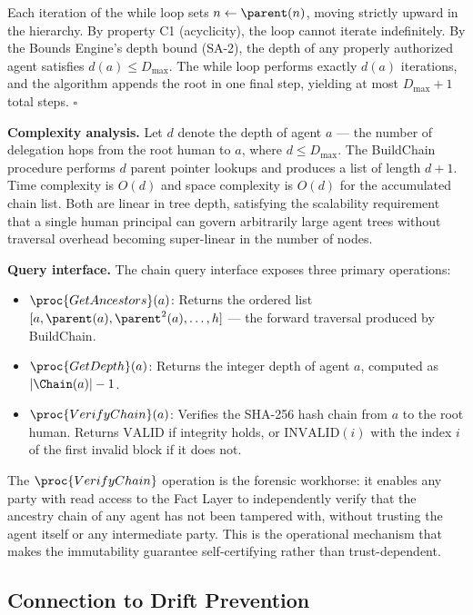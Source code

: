 \begin{Proof}
Each iteration of the while loop sets $n \gets \parent(n)$, moving strictly upward in the hierarchy. By property C1 (acyclicity), the loop cannot iterate indefinitely. By the Bounds Engine's depth bound (SA-2), the depth of any properly authorized agent satisfies $d(a) \leq D_{\max}$. The while loop performs exactly $d(a)$ iterations, and the algorithm appends the root in one final step, yielding at most $D_{\max} + 1$ total steps. $\square$
\end{Proof}

\bigskip
\noindent\textbf{Complexity analysis.} Let $d$ denote the depth of agent $a$ — the number of delegation hops from the root human to $a$, where $d \leq D_{\max}$. The BuildChain procedure performs $d$ parent pointer lookups and produces a list of length $d + 1$. Time complexity is $O(d)$ and space complexity is $O(d)$ for the accumulated chain list. Both are linear in tree depth, satisfying the scalability requirement that a single human principal can govern arbitrarily large agent trees without traversal overhead becoming super-linear in the number of nodes.

\bigskip
\noindent\textbf{Query interface.} The chain query interface exposes three primary operations:

\begin{itemize}
    \item $\proc{GetAncestors}(a)$: Returns the ordered list $[a, \parent(a), \parent^2(a), \ldots, h]$ — the forward traversal produced by BuildChain.
    \item $\proc{GetDepth}(a)$: Returns the integer depth of agent $a$, computed as $|\Chain(a)| - 1$.
    \item $\proc{VerifyChain}(a)$: Verifies the SHA-256 hash chain from $a$ to the root human. Returns $\text{VALID}$ if integrity holds, or $\text{INVALID}(i)$ with the index $i$ of the first invalid block if it does not.
\end{itemize}

The $\proc{VerifyChain}$ operation is the forensic workhorse: it enables any party with read access to the Fact Layer to independently verify that the ancestry chain of any agent has not been tampered with, without trusting the agent itself or any intermediate party. This is the operational mechanism that makes the immutability guarantee self-certifying rather than trust-dependent.

\subsection{Connection to Drift Prevention}
\label{sec:ipp-drift-prevention}

